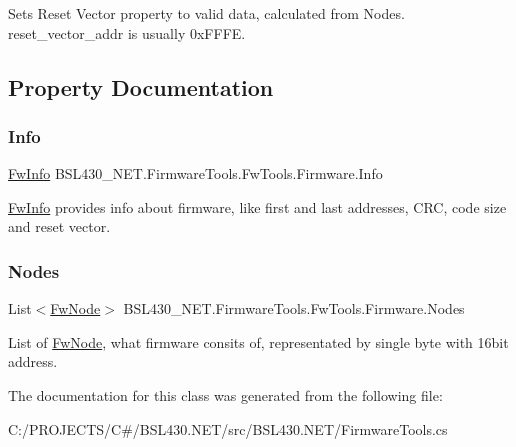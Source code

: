Sets Reset Vector property to valid data, calculated from Nodes. reset\+\_\+vector\+\_\+addr is usually 0x\+F\+F\+FE. 



\subsection{Property Documentation}
\mbox{\label{class_b_s_l430___n_e_t_1_1_firmware_tools_1_1_fw_tools_1_1_firmware_ab0d46ec0a0f7ddfdd93e2fc0407a78b8}} 
\subsubsection{\texorpdfstring{Info}{Info}}
{\footnotesize\ttfamily \mbox{\hyperlink{class_b_s_l430___n_e_t_1_1_firmware_tools_1_1_fw_tools_1_1_fw_info}{Fw\+Info}} B\+S\+L430\+\_\+\+N\+E\+T.\+Firmware\+Tools.\+Fw\+Tools.\+Firmware.\+Info\hspace{0.3cm}{\ttfamily [get]}}



\mbox{\hyperlink{class_b_s_l430___n_e_t_1_1_firmware_tools_1_1_fw_tools_1_1_fw_info}{Fw\+Info}} provides info about firmware, like first and last addresses, C\+RC, code size and reset vector. 

\mbox{\label{class_b_s_l430___n_e_t_1_1_firmware_tools_1_1_fw_tools_1_1_firmware_a5538ddda063e61683bc7ce23d329afc2}} 
\subsubsection{\texorpdfstring{Nodes}{Nodes}}
{\footnotesize\ttfamily List$<$\mbox{\hyperlink{class_b_s_l430___n_e_t_1_1_firmware_tools_1_1_fw_tools_1_1_fw_node}{Fw\+Node}}$>$ B\+S\+L430\+\_\+\+N\+E\+T.\+Firmware\+Tools.\+Fw\+Tools.\+Firmware.\+Nodes\hspace{0.3cm}{\ttfamily [get]}}



List of \mbox{\hyperlink{class_b_s_l430___n_e_t_1_1_firmware_tools_1_1_fw_tools_1_1_fw_node}{Fw\+Node}}, what firmware consits of, representated by single byte with 16bit address. 



The documentation for this class was generated from the following file\+:\begin{DoxyCompactItemize}
\item 
C\+:/\+P\+R\+O\+J\+E\+C\+T\+S/\+C\#/\+B\+S\+L430.\+N\+E\+T/src/\+B\+S\+L430.\+N\+E\+T/Firmware\+Tools.\+cs\end{DoxyCompactItemize}
